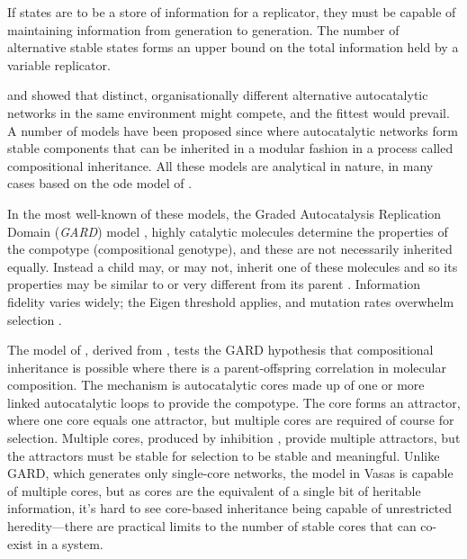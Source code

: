 If states are to be a store of information for a replicator, they must be capable of maintaining information from generation to generation. The number of alternative stable states forms an upper bound on the total information held by a variable replicator.

\Textcite{Ganti:2003hl} and  \textcite{Eigen1971} showed that distinct, organisationally different alternative autocatalytic networks in the same environment might compete, and the fittest would prevail. A number of models have been proposed since where autocatalytic networks form stable components that can be inherited in a modular fashion in a process called compositional inheritance. All these models are analytical in nature, in many cases based on the \gls{ode} model of \cite{Farmer1986}.


In the most well-known of these models, the Graded Autocatalysis Replication Domain (\emph{GARD}) model \parencite{Segre1998}, highly catalytic molecules determine the properties of the compotype (compositional genotype), and these are not necessarily inherited equally. Instead a child may, or may not, inherit one of these molecules and so its properties may be similar to or very different from its parent \parencite{Vasas2015, Vasas2012, Vasas2012a}. Information fidelity varies widely; the Eigen threshold \parencite{Eigen1971} applies, and mutation rates overwhelm selection \parencite{Vasas2015, Vasas2012, Vasas2012a}.


The model of \textcite{Vasas2015, Vasas2012, Vasas2012a}, derived from \textcite{Farmer1986}, tests the GARD hypothesis that compositional inheritance is possible where there is a parent-offspring correlation in molecular composition. The mechanism is autocatalytic cores made up of one or more linked autocatalytic loops to provide the compotype. The core forms an attractor, where one core equals one attractor, but multiple cores are required of course for selection. Multiple cores, produced by inhibition \cite{Vasas2012a}, provide multiple attractors, but the attractors must be stable for selection to be stable and meaningful. Unlike GARD, which generates only single-core networks, the model in Vasas is capable of multiple cores, but as cores are the equivalent of a single bit of heritable information, it's hard to see core-based inheritance being capable of unrestricted heredity---there are practical limits to the number of stable cores that can co-exist in a system. 

